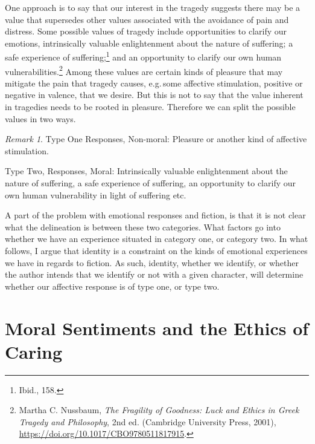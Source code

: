 \documentclass[phdthesis,12pt,final,a4paper]{wuthesis}
\theoremstyle{definition}
\theoremstyle{definition}
\theoremstyle{definition}
\theoremstyle{definition}
\theoremstyle{remark}
\newtheorem*{remark}{Remark}
\begin{document}
One approach is to say that our interest in the tragedy suggests there may be a value that supersedes other values associated with the avoidance of pain and distress. Some possible values of tragedy include opportunities to clarify our emotions, intrinsically valuable enlightenment about the nature of suffering; a safe experience of suffering;\footnote{Ibid., 158.} and an opportunity to clarify our own human vulnerabilities.\footnote{Martha C. Nussbaum, \emph{The {Fragility} of {Goodness}: {Luck} and {Ethics} in {Greek Tragedy} and {Philosophy}}, 2nd ed. (Cambridge University Press, 2001), \url{https://doi.org/10.1017/CBO9780511817915}.} Among these values are certain kinds of pleasure that may mitigate the pain that tragedy causes, e.g.\,some affective stimulation, positive or negative in valence, that we desire. But this is not to say that the value inherent in tragedies needs to be rooted in pleasure. Therefore we can split the possible values in two ways.

\begin{remark}
Type One Responses, Non-moral: Pleasure or another kind of affective stimulation.

Type Two, Responses, Moral: Intrinsically valuable enlightenment about the nature of suffering, a safe experience of suffering, an opportunity to clarify our own human vulnerability in light of suffering etc.
\end{remark}

A part of the problem with emotional responses and fiction, is that it is not clear what the delineation is between these two categories. What factors go into whether we have an experience situated in category one, or category two. In what follows, I argue that identity is a constraint on the kinds of emotional experiences we have in regards to fiction. As such, identity, whether we identify, or whether the author intends that we identify or not with a given character, will determine whether our affective response is of type one, or type two.

\section{Moral Sentiments and the Ethics of Caring}\label{moral-sentiments-and-the-ethics-of-caring}
\end{document}
